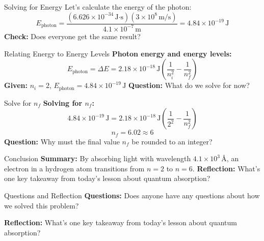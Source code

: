 \documentclass{beamer}
\begin{document}
\begin{frame}{Solving for Energy}
    Let's calculate the energy of the photon: \pause
    \[
    E_{\text{photon}} = \frac{(6.626 \times 10^{-34} \, \text{J·s})(3 \times 10^8 \, \text{m/s})}{4.1 \times 10^{-7} \, \text{m}} = 4.84 \times 10^{-19} \, \text{J}
    \]
    \pause
    \textbf{Check:} Does everyone get the same result? 
\end{frame}

\begin{frame}{Relating Energy to Energy Levels}
    \textbf{Photon energy and energy levels:} \pause
    \[
    E_{\text{photon}} = \Delta E = 2.18 \times 10^{-18} \, \text{J} \left( \frac{1}{n_i^2} - \frac{1}{n_f^2} \right)
    \] \pause
    \textbf{Given:} \( n_i = 2 \), \(E_{\text{photon}} = 4.84 \times 10^{-19} \, \text{J} \) \pause
    \textbf{Question:} What do we solve for now? \pause
\end{frame}

\begin{frame}{Solve for \(n_f\)}
    \textbf{Solving for \(n_f\):} \pause
    \[
    4.84 \times 10^{-19} \, \text{J} = 2.18 \times 10^{-18} \, \text{J} \left( \frac{1}{2^2} - \frac{1}{n_f^2} \right)
    \] \pause
    \[
    n_f = 6.02 \approx 6
    \]
    \pause
    \textbf{Question:} Why must the final value \(n_f\) be rounded to an integer? 
\end{frame}

\begin{frame}{Conclusion}
    \textbf{Summary:} \pause
    By absorbing light with wavelength \( 4.1 \times 10^3 \, \text{\AA} \), an electron in a hydrogen atom transitions from \(n = 2\) to \(n = 6\). \pause
    \textbf{Reflection:} What’s one key takeaway from today’s lesson about quantum absorption?
\end{frame}

\begin{frame}{Questions and Reflection}
    \textbf{Questions:} \pause
    Does anyone have any questions about how we solved this problem? \pause

    \textbf{Reflection:} What’s one key takeaway from today’s lesson about quantum absorption?
\end{frame}
\end{document}
